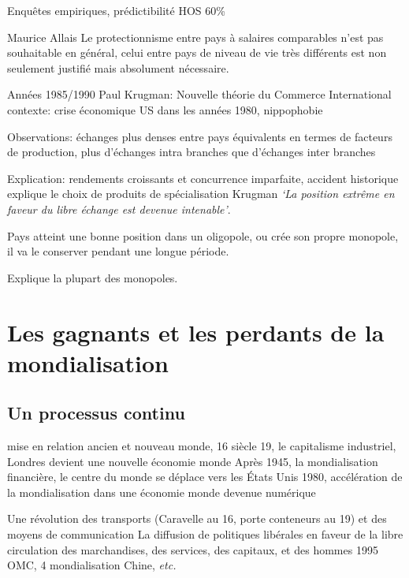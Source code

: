 \documentclass[main.tex]{subfiles}
\begin{document}
        Enquêtes empiriques, prédictibilité HOS 60\%

        Maurice Allais
        Le protectionnisme entre pays à salaires comparables n'est pas souhaitable en général, celui entre pays de niveau de vie très différents est non seulement justifié mais absolument nécessaire.

        Années 1985/1990 Paul Krugman: Nouvelle théorie du Commerce International
        contexte: crise économique US dans les années 1980, nippophobie

        Observations: échanges plus denses entre pays équivalents en termes de facteurs de production, plus d'échanges intra branches que d'échanges inter branches

Explication: rendements croissants et concurrence imparfaite, accident historique explique le choix de produits de spécialisation
Krugman \textit{`La position extrême en faveur du libre échange est devenue intenable'}.

\begin{definition}
       Pays atteint une bonne position dans un oligopole, ou crée son propre monopole, il va le conserver pendant une longue période.
\end{definition}

\begin{definition}
       Explique la plupart des monopoles. 
\end{definition}

        \section{Les gagnants et les perdants de la mondialisation}

        \subsection{Un processus continu}
        mise en relation ancien et nouveau monde, 16 siècle
        19, le capitalisme industriel, Londres devient une nouvelle économie monde
        Après 1945, la mondialisation financière, le centre du monde se déplace vers les États Unis
        1980, accélération de la mondialisation dans une économie monde devenue numérique


        Une révolution des transports (Caravelle au 16, porte conteneurs au 19) et des moyens de communication
        La diffusion de politiques libérales en faveur de la libre circulation des marchandises, des services, des capitaux, et des hommes
        1995 OMC, 4 mondialisation Chine, \textit{etc.}
\end{document}

